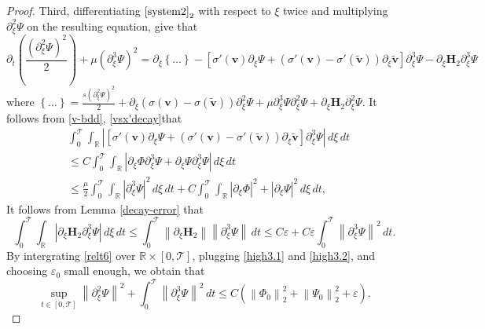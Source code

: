 \documentclass[12pt,reqno]{amsart}
\numberwithin{equation}{section}
\newcommand{\norm}[1]{\left\lVert #1 \right\rVert}
\newcommand{\abs}[1]{\left\lvert #1 \right\rvert}
\newcommand{\subeqref}[2]{$ \eqref{#1}_{#2} $}
\def\p{\partial}
\def\R{\mathbb{R}}
\def\T{\mathcal{T}}
\def\supt{\mathop{sup}\limits_{t \in [0,\mathcal{T}]}}
\begin{document}
\begin{proof}
		Third, differentiating \subeqref{system2}{2} with respect to $\xi$ twice and multiplying $\p^2_{\xi}\Psi$
		on the resulting equation, give that
		\begin{equation}\label{relt6}
			\p_t\left(\frac{(\p^2_{\xi}\Psi)^2}{2}\right)+\mu(\p^3_{\xi}\Psi)^2=\p_{\xi}\left\{\dots\right\}-[\sigma'(\mathbf{v})\p_{\xi}\Psi+(\sigma'(\mathbf{v})-\sigma'(\mathbf{\tilde{v}}))\p_{\xi}\mathbf{\tilde{v}}]\p^3_{\xi}\Psi
			-\p_{\xi}\mathbf{H}_2\p^3_{\xi}\Psi
		\end{equation}
		where $\left\{\dots\right\}=\frac{s(\p^2_{\xi}\Psi)^2}{2}+\p_{\xi}(\sigma(\mathbf{v})-\sigma(\mathbf{\tilde{v}}))\p^2_{\xi}\Psi+\mu\p^3_{\xi}\Psi\p^2_{\xi}\Psi+\p_{\xi}\mathbf{H}_2\p^2_{\xi}\Psi$. It follows from \eqref{v-bdd}, \eqref{vsx'decay}that
		\begin{equation}\label{high3.1}
			\begin{aligned}
				&\int_{0}^{\T}\int_{\R}\abs{[\sigma'(\mathbf{v})\p_{\xi}\Psi+(\sigma'(\mathbf{v})-\sigma'(\mathbf{\tilde{v}}))\p_{\xi}\mathbf{\tilde{v}}]\p^3_{\xi}\Psi}\,d\xi\,dt\\
				&\leq C\int_{0}^{\T}\int_{\R}\abs{\p_{\xi}\Phi\p^3_{\xi}\Psi+\p_{\xi}\Psi\p^3_{\xi}\Psi}\,d\xi\,dt\\
				&\leq\frac{\mu}{2}\int_{0}^{\T}\int_{\R}\abs{\p^3_{\xi}\Psi}^2\,d\xi\,dt+C\int_{0}^{\T}\int_{\R}\abs{\p_{\xi}\Phi}^2+\abs{\p_{\xi}\Psi}^2\,d\xi\,dt,
			\end{aligned}
		\end{equation}
		It follows from Lemma \ref{decay-error} that
		\begin{equation}\label{high3.2}
			\int_{0}^{\T}\int_{\R}\abs{\p_{\xi}\mathbf{H}_2\p^3_{\xi}\Psi}\,d\xi\,dt\leq\int_{0}^{\T}\norm{\p_{\xi}\mathbf{H}_2}\norm{\p^3_{\xi}\Psi}\,dt\leq C\varepsilon+C\varepsilon\int_{0}^{\T}\norm{\p^3_{\xi}\Psi}^2\,dt. 
		\end{equation}
		By intergrating \eqref{relt6} over $\R\times[0,\T]$, plugging \eqref{high3.1} and \eqref{high3.2}, and choosing $\varepsilon_0$ small enough, we obtain that
		\begin{equation}\label{estimate4}
			\supt\norm{\p^2_{\xi}\Psi}^2+\int_{0}^{\T}\norm{\p^3_{\xi}\Psi}^2\,dt\leq C(\norm{\Phi_0}^2_2+\norm{\Psi_0}^2_2+\varepsilon).
		\end{equation}
		

\end{proof}
\end{document}
